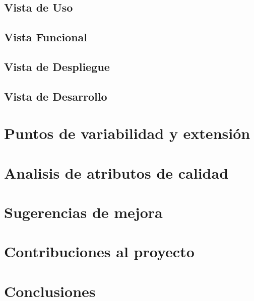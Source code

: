 \documentclass{article}
\begin{document}
  
\subsection{Vista de Uso}
\subsection{Vista Funcional}
\subsection{Vista de Despliegue}
\subsection{Vista de Desarrollo}



\section{Puntos de variabilidad y extensión}
\section{Analisis de atributos de calidad}
\section{Sugerencias de mejora}
\section{Contribuciones al proyecto}
\section{Conclusiones}



\end{document}
